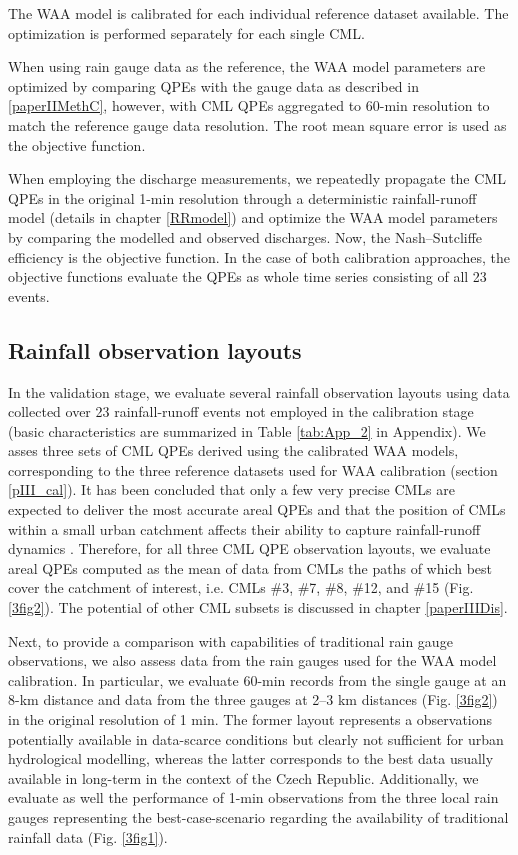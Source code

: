 \documentclass{ctuthesis}\usepackage[]{graphicx}\usepackage[]{color}
\begin{document}
The WAA model is calibrated for each individual reference dataset available. The optimization is performed separately for each single CML. 

When using rain gauge data as the reference, the WAA model parameters are optimized by comparing QPEs with the gauge data as described in \ref{paperIIMethC}, however, with CML QPEs aggregated to 60-min resolution to match the reference gauge data resolution. The root mean square error is used as the objective function. 

When employing the discharge measurements, we repeatedly propagate the CML QPEs in the original 1-min resolution through a deterministic rainfall-runoff model (details in chapter \ref{RRmodel}) and optimize the WAA model parameters by comparing the modelled and observed discharges. Now, the Nash–Sutcliffe efficiency is the objective function. In the case of both calibration approaches, the objective functions evaluate the QPEs as whole time series consisting of all 23 events.


\subsection{Rainfall observation layouts} \label{pIII_rainfall_scen}

In the validation stage, we evaluate several rainfall observation layouts using data collected over 23 rainfall-runoff events not employed in the calibration stage (basic characteristics are summarized in Table \ref{tab:App_2} in Appendix). We asses three sets of CML QPEs derived using the calibrated WAA models, corresponding to the three reference datasets used for WAA calibration (section \ref{pIII_cal}). It has been concluded that only a few very precise CMLs are expected to deliver the most accurate areal QPEs \citep{fenclCommercialMicrowaveLinks2015} and that the position of CMLs within a small urban catchment affects their ability to capture rainfall-runoff dynamics \citep[][chapter \ref{chap5}]{pastorekCommercialMicrowaveLinks2019}. Therefore, for all three CML QPE observation layouts, we evaluate areal QPEs computed as the mean of data from CMLs the paths of which best cover the catchment of interest, i.e. CMLs \#3, \#7, \#8, \#12, and \#15 (Fig. \ref{3fig2}). The potential of other CML subsets is discussed in chapter \ref{paperIIIDis}.

Next, to provide a comparison with capabilities of traditional rain gauge observations, we also assess data from the rain gauges used for the WAA model calibration. In particular, we evaluate 60-min records from the single gauge at an 8-km distance and data from the three gauges at 2--3 km distances (Fig. \ref{3fig2}) in the original resolution of 1 min. The former layout represents a observations potentially available in data-scarce conditions but clearly not sufficient for urban hydrological modelling, whereas the latter corresponds to the best data usually available in long-term in the context of the Czech Republic. Additionally, we evaluate as well the performance of 1-min observations from the three local rain gauges representing the best-case-scenario regarding the availability of traditional rainfall data (Fig. \ref{3fig1}).
\end{document}
